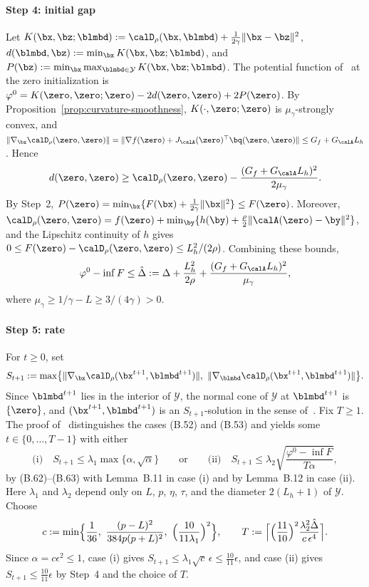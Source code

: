 \paragraph{Step 4: initial gap}
Let \(K(\bx,\bz;\blmbd):=\calD_\rho(\bx,\blmbd)+\frac1{2\gamma}\|\bx-\bz\|^2\),
\(d(\blmbd,\bz):=\min_{\bx}K(\bx,\bz;\blmbd)\), and
\(P(\bz):=\min_{\bx}\max_{\blmbd\in\mathcal Y}K(\bx,\bz;\blmbd)\). The
potential function of~\cite[(4.1)]{zhang2020smoothed} at the zero
initialization is \(\varphi^0=K(\zero,\zero;\zero)-2d(\zero,\zero)+2P(\zero)\).
By Proposition~\ref{prop:curvature-smoothness}, \(K(\cdot,\zero;\zero)\) is
\(\mu_\gamma\)-strongly convex, and
\(\|\nabla_{\bx}\calD_\rho(\zero,\zero)\|
=\|\nabla f(\zero)+J_{\calA}(\zero)^\top\bq(\zero,\zero)\|\le G_f+G_{\calA}L_h\).
Hence
\[
d(\zero,\zero)\ge\calD_\rho(\zero,\zero)-\frac{(G_f+G_{\calA}L_h)^2}{2\mu_\gamma}.
\]
By Step~2, \(P(\zero)=\min_{\bx}\{F(\bx)+\frac1{2\gamma}\|\bx\|^2\}\le F(\zero)\).
Moreover,
\(\calD_\rho(\zero,\zero)=f(\zero)+\min_{\by}\{h(\by)+\frac\rho2\|\calA(\zero)-\by\|^2\}\),
and the Lipschitz continuity of \(h\) gives
\(0\le F(\zero)-\calD_\rho(\zero,\zero)\le L_h^2/(2\rho)\). Combining these
bounds,
\[
\varphi^0-\inf F\le\hat\Delta
:=\Delta+\frac{L_h^2}{2\rho}+\frac{(G_f+G_{\calA}L_h)^2}{\mu_\gamma},
\]
where \(\mu_\gamma\ge1/\gamma-L\ge3/(4\gamma)>0\).

\paragraph{Step 5: rate}
For \(t\ge0\), set
\[
S_{t+1}:=\max\bigl\{\|\nabla_{\bx}\calD_\rho(\bx^{t+1},\blmbd^{t+1})\|,\
\|\nabla_{\blmbd}\calD_\rho(\bx^{t+1},\blmbd^{t+1})\|\bigr\}.
\]
Since \(\blmbd^{t+1}\) lies in the interior of \(\mathcal Y\), the normal
cone of \(\mathcal Y\) at \(\blmbd^{t+1}\) is \(\{\zero\}\), and
\((\bx^{t+1},\blmbd^{t+1})\) is an \(S_{t+1}\)-solution in the sense
of~\cite[Definition~3.1]{zhang2020smoothed}. Fix \(T\ge1\). The proof
of~\cite[Theorem~3.4]{zhang2020smoothed} distinguishes the cases (B.52) and
(B.53) and yields some \(t\in\{0,\dots,T-1\}\) with either
\[
\text{(i)}\quad S_{t+1}\le\lambda_1\max\{\alpha,\sqrt\alpha\}
\qquad\text{or}\qquad
\text{(ii)}\quad S_{t+1}\le\lambda_2\sqrt{\frac{\varphi^0-\inf F}{T\alpha}},
\]
by (B.62)--(B.63) with Lemma~B.11 in case (i) and by Lemma~B.12 in case (ii).
Here \(\lambda_1\) and \(\lambda_2\) depend only on \(L\), \(p\), \(\eta\),
\(\tau\), and the diameter \(2(L_h+1)\) of \(\mathcal Y\). Choose
\[
c:=\min\Bigl\{\frac1{36},\ \frac{(p-L)^2}{384p(p+L)^2},\
\Bigl(\frac{10}{11\lambda_1}\Bigr)^2\Bigr\},
\qquad
T:=\Bigl\lceil\Bigl(\frac{11}{10}\Bigr)^2\frac{\lambda_2^2\hat\Delta}{c\,\epsilon^4}\Bigr\rceil.
\]
Since \(\alpha=c\epsilon^2\le1\), case (i) gives
\(S_{t+1}\le\lambda_1\sqrt c\,\epsilon\le\frac{10}{11}\epsilon\), and case
(ii) gives \(S_{t+1}\le\frac{10}{11}\epsilon\) by Step~4 and the choice of
\(T\).

